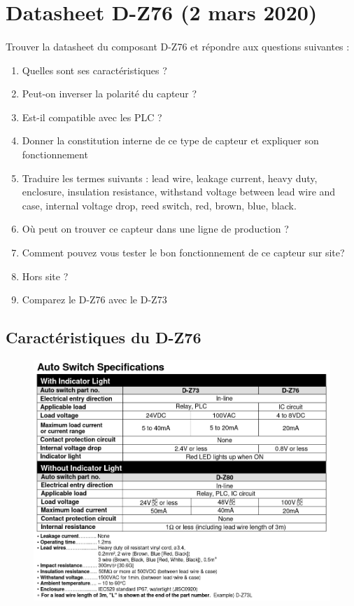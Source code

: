\documentclass{article}
\begin{document}
\newpage
\section{Datasheet D-Z76 (2 mars 2020)}
\paragraph{}
Trouver la datasheet du composant D-Z76 et répondre aux questions suivantes :
\begin{enumerate}
    \item Quelles sont ses caractéristiques ?
    \item Peut-on inverser la polarité du capteur ?
    \item Est-il compatible avec les PLC ?
    \item Donner la constitution interne de ce type de capteur et expliquer son fonctionnement
    \item Traduire les termes suivants : lead wire, leakage current, heavy duty, enclosure, insulation resistance, withstand voltage between lead wire and case, internal voltage drop, reed switch, red, brown, blue, black.
    \item Où peut on trouver ce capteur dans une ligne de production ?
    \item Comment pouvez vous tester le bon fonctionnement de ce capteur sur site?
    \item Hors site ?
    \item Comparez le D-Z76 avec le D-Z73
\end{enumerate}

\subsection{Caractéristiques du D-Z76}
\begin{figure}[H]
    \centering
    \includegraphics[width=.8\linewidth]{images/D-Z76-specs.png}
\end{figure}
\end{document}
